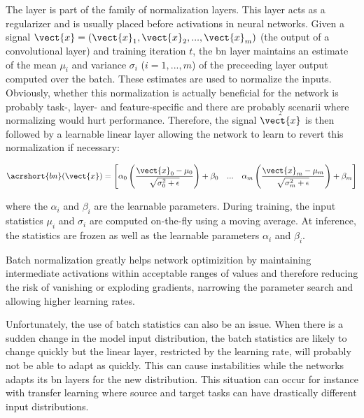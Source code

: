 The  \parencite{ioffe2015batch} layer is part of the family of normalization layers. This layer acts as a regularizer and is usually placed before activations in neural networks. Given a signal $\vect{x} = \left(\vect{x}_1, \vect{x}_2, ..., \vect{x}_m\right)$ (\eg the output of a convolutional layer) and training iteration $t$, the \acrshort{bn} layer maintains an estimate of the mean $\mu_i$ and variance $\sigma_i$ ($i = 1, ..., m$) of the preceeding layer output computed over the batch. These estimates are used to normalize the inputs. Obviously, whether this normalization is actually beneficial for the network is probably task-, layer- and feature-specific and there are probably scenarii where normalizing would hurt performance. Therefore, the signal $\hat{\vect{x}}$ is then followed by a learnable linear layer allowing the network to learn to revert this normalization if necessary:

\begin{equation}
\label{eqn:backml:bn}
\acrshort{bn}(\vect{x}) = \begin{bmatrix}
\alpha_0 \left(\dfrac{\vect{x}_0 - \mu_0}{\sqrt{\sigma^2_0 + \epsilon}}\right) + \beta_0 & ... & \alpha_m \left(\dfrac{\vect{x}_m - \mu_m}{\sqrt{\sigma^2_m + \epsilon}}\right) + \beta_m \\
\end{bmatrix}\end{equation} 

where the $\alpha_i$ and $\beta_i$ are the learnable parameters. During training, the input statistics $\mu_i$ and $\sigma_i$ are computed on-the-fly using a moving average. At inference, the statistics are frozen as well as the learnable parameters $\alpha_i$ and $\beta_i$.      
  
Batch normalization greatly helps network optimizition by maintaining intermediate activations within acceptable ranges of values and therefore reducing the risk of vanishing or exploding gradients, narrowing the parameter search and allowing higher learning rates. 

Unfortunately, the use of batch statistics can also be an issue. When there is a sudden change in the model input distribution, the batch statistics are likely to change quickly but the linear layer, restricted by the learning rate, will probably not be able to adapt as quickly. This can cause instabilities while the networks adapts its \acrlong{bn} layers for the new distribution. This situation can occur for instance with transfer learning where source and target tasks can have drastically different input distributions. 

